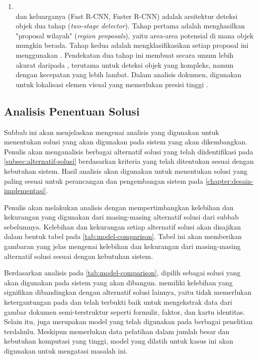 \begin{enumerate}
    \item \rcnn{} ~\\ \rcnn{} dan keluarganya (Fast R-CNN, Faster R-CNN) adalah arsitektur deteksi objek dua tahap (\textit{two-stage detector}). Tahap pertama adalah menghasilkan "proposal wilayah" (\textit{region proposals}), yaitu area-area potensial di mana objek mungkin berada. Tahap kedua adalah mengklasifikasikan setiap proposal ini menggunakan \cnn. Pendekatan dua tahap ini membuat \rcnn{} secara umum lebih akurat daripada \yolo, terutama untuk deteksi objek yang kompleks, namun dengan kecepatan yang lebih lambat. Dalam analisis dokumen, \rcnn{} digunakan untuk lokalisasi elemen visual yang memerlukan presisi tinggi \parencite{xie2021oriented}.
\end{enumerate}

\subsection{Analisis Penentuan Solusi}
\label{subsec:analisis-penentuan-solusi}

Subbab ini akan menjelaskan mengenai analisis yang digunakan untuk menentukan solusi yang akan digunakan pada sistem yang akan dikembangkan. Penulis akan menganalisis berbagai alternatif solusi yang telah diidentifikasi pada \autoref{subsec:alternatif-solusi} berdasarkan kriteria yang telah ditentukan sesuai dengan kebutuhan sistem. Hasil analisis akan digunakan untuk menentukan solusi yang paling sesuai untuk perancangan dan pengembangan sistem pada \autoref{chapter:desain-implementasi}.

Penulis akan melakukan analisis dengan mempertimbangkan kelebihan dan kekurangan yang digunakan dari masing-masing alternatif solusi dari subbab sebelumnya. Kelebihan dan kekurangan setiap alternatif solusi akan disajikan dalam bentuk tabel pada \autoref{tab:model-comparison}. Tabel ini akan memberikan gambaran yang jelas mengenai kelebihan dan kekurangan dari masing-masing alternatif solusi sesuai dengan kebutuhan sistem.

Berdasarkan analisis pada \autoref{tab:model-comparison}, \donut{} dipilih sebagai solusi yang akan digunakan pada sistem yang akan dibangun. \donut{} memiliki kelebihan yang signifikan dibandingkan dengan alternatif solusi lainnya, yaitu tidak memerlukan ketergantungan pada \ocr{} dan telah terbukti baik untuk mengekstrak data dari gambar dokumen semi-terstruktur seperti formulir, faktor, dan kartu identitas. Selain itu, \donut{} juga merupakan model \sota{} yang telah digunakan pada berbagai penelitian terdahulu. Meskipun \donut{} memerlukan data pelatihan dalam jumlah besar dan kebutuhan komputasi yang tinggi, model \donut{} yang dilatih untuk kasus ini akan digunakan untuk mengatasi masalah ini.

